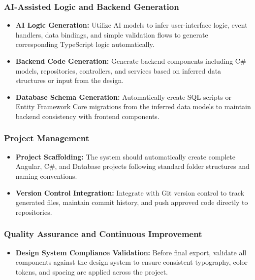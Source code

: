 \subsubsection{AI-Assisted Logic and Backend Generation}

\begin{itemize}
    \item \textbf{AI Logic Generation:}
    Utilize AI models to infer user-interface logic, event handlers, data bindings, and simple validation flows to generate corresponding TypeScript logic automatically.
    \item \textbf{Backend Code Generation:}
    Generate backend components including C\# models, repositories, controllers, and services based on inferred data structures or input from the design.
    \item \textbf{Database Schema Generation:}
    Automatically create SQL scripts or Entity Framework Core migrations from the inferred data models to maintain backend consistency with frontend components.
\end{itemize}

\subsubsection{Project Management}

\begin{itemize}
    \item \textbf{Project Scaffolding:}
    The system should automatically create complete Angular, C\#, and Database projects following standard folder structures and naming conventions.
    \item \textbf{Version Control Integration:}
    Integrate with Git version control to track generated files, maintain commit history, and push approved code directly to repositories.
\end{itemize}

\subsubsection{Quality Assurance and Continuous Improvement}

\begin{itemize}
    \item \textbf{Design System Compliance Validation:}
    Before final export, validate all components against the design system to ensure consistent typography, color tokens, and spacing are applied across the project.
\end{itemize}

